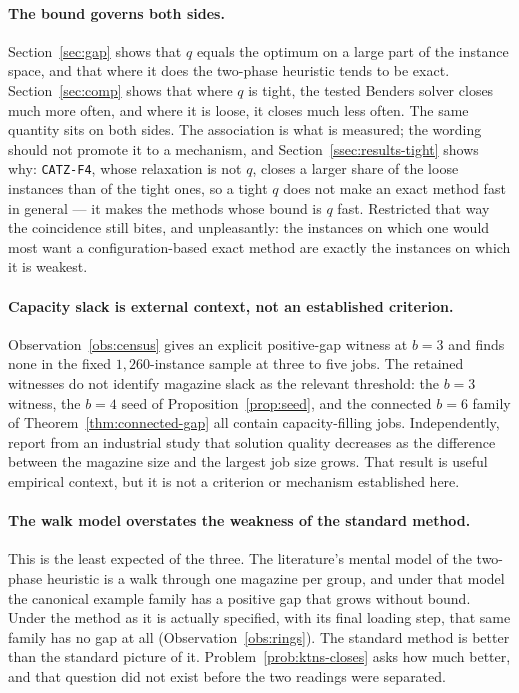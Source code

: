\paragraph{The bound governs both sides.}
Section~\ref{sec:gap} shows that $q$ equals the optimum on a large part of the
instance space, and that where it does the two-phase heuristic tends to be exact.
Section~\ref{sec:comp} shows that where $q$ is tight, the tested Benders solver closes
much more often, and where it is loose, it closes much less often. The same quantity
sits on both sides. The association is what is measured; the wording should not promote it to a
mechanism, and Section~\ref{ssec:results-tight} shows why: \texttt{CATZ-F4}, whose
relaxation is not $q$, closes a larger share of the loose instances than of the tight
ones, so a tight $q$ does not make an exact method fast in general --- it makes the
methods whose bound is $q$ fast. Restricted that way the coincidence still bites, and
unpleasantly: the instances on which one would most want a configuration-based exact
method are exactly the instances on which it is weakest.

\paragraph{Capacity slack is external context, not an established criterion.}
Observation~\ref{obs:census} gives an explicit positive-gap witness at $b=3$ and finds
none in the fixed $1{,}260$-instance sample at three to five jobs. The retained
witnesses do not identify magazine slack as the relevant threshold: the $b=3$ witness,
the $b=4$ seed of Proposition~\ref{prop:seed}, and the connected $b=6$ family of
Theorem~\ref{thm:connected-gap} all contain capacity-filling jobs. Independently,
\citet{Burger2015} report from an industrial study that solution quality decreases as
the difference between the magazine size and the largest job size grows. That result
is useful empirical context, but it is not a criterion or mechanism established here.

\paragraph{The walk model overstates the weakness of the standard method.}
This is the least expected of the three. The literature's mental model of the
two-phase heuristic is a walk through one magazine per group, and under that model the
canonical example family has a positive gap that grows without bound. Under the method
as it is actually specified, with its final loading step, that same family has no gap
at all (Observation~\ref{obs:rings}). The standard method is better than the standard
picture of it. Problem~\ref{prob:ktns-closes} asks how much better, and that question
did not exist before the two readings were separated.

